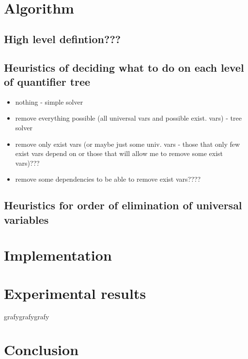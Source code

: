 \documentclass[
  digital, %
  twoside, %
  table,   %
  nolof,     %
  nolot,     %
]{fithesis3}
\theoremstyle{definition}
\theoremstyle{remark}
\begin{document}
\chapter{Algorithm}
\label{chap:algorithm}

\section{High level defintion???}

\section{Heuristics of deciding what to do on each level of quantifier tree}
\begin{itemize}
    \item nothing - simple solver
    \item remove everything possible (all universal vars and possible exist. vars) - tree solver
    \item remove only exist vars (or maybe just some univ. vars - those that only few exist vars depend on or those that will allow me to remove some exist vars)???
    \item remove some dependencies to be able to remove exist vars????
\end{itemize}

\section{Heuristics for order of elimination of universal variables}

\chapter{Implementation}

\chapter{Experimental results}
grafygrafygrafy

\chapter*{Conclusion}

\printbibliography[heading=bibintoc]

\end{document}
